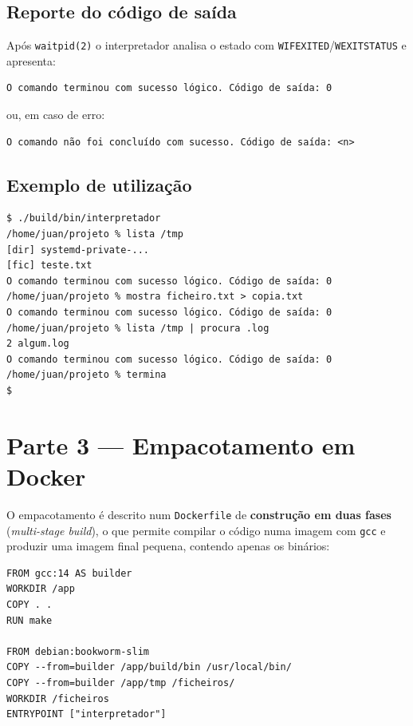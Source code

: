 \documentclass[11pt,a4paper]{article}
\begin{document}
\subsection{Reporte do código de saída}

Após \texttt{waitpid(2)} o interpretador analisa o estado com \texttt{WIFEXITED}/\texttt{WEXITSTATUS} e apresenta:

\begin{lstlisting}[style=shellstyle]
O comando terminou com sucesso lógico. Código de saída: 0
\end{lstlisting}

ou, em caso de erro:

\begin{lstlisting}[style=shellstyle]
O comando não foi concluído com sucesso. Código de saída: <n>
\end{lstlisting}

\subsection{Exemplo de utilização}

\begin{lstlisting}[style=shellstyle]
$ ./build/bin/interpretador
/home/juan/projeto % lista /tmp
[dir] systemd-private-...
[fic] teste.txt
O comando terminou com sucesso lógico. Código de saída: 0
/home/juan/projeto % mostra ficheiro.txt > copia.txt
O comando terminou com sucesso lógico. Código de saída: 0
/home/juan/projeto % lista /tmp | procura .log
2 algum.log
O comando terminou com sucesso lógico. Código de saída: 0
/home/juan/projeto % termina
$
\end{lstlisting}

\section{Parte 3 --- Empacotamento em Docker}

O empacotamento é descrito num \texttt{Dockerfile} de \textbf{construção em duas fases} (\textit{multi-stage build}), o que permite compilar o código numa imagem com \texttt{gcc} e produzir uma imagem final pequena, contendo apenas os binários:

\begin{lstlisting}[style=shellstyle,caption={\texttt{Dockerfile}}]
FROM gcc:14 AS builder
WORKDIR /app
COPY . .
RUN make

FROM debian:bookworm-slim
COPY --from=builder /app/build/bin /usr/local/bin/
COPY --from=builder /app/tmp /ficheiros/
WORKDIR /ficheiros
ENTRYPOINT ["interpretador"]
\end{lstlisting}
\end{document}
